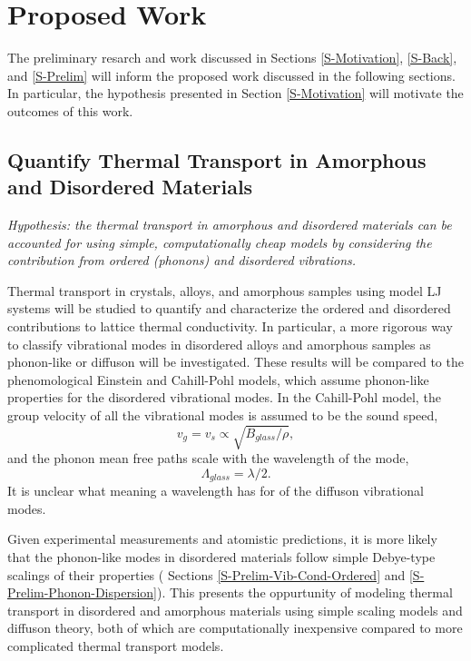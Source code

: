 \documentclass[letterpaper,12pt]{article}
\begin{document}
\section{\label{S-Propsed-Work}Proposed Work}

The preliminary resarch and work discussed in Sections \ref{S-Motivation}, \ref{S-Back}, and \ref{S-Prelim} will inform the proposed work discussed in the following sections. In particular, the hypothesis presented in Section \ref{S-Motivation} will motivate the outcomes of this work.

\subsection{\label{S-Research-Objectives-1}Quantify Thermal Transport in Amorphous and Disordered Materials}

\textit{Hypothesis: the thermal transport in amorphous and disordered materials can be accounted for using simple, computationally cheap models by considering the contribution from ordered (phonons) and disordered vibrations.}

Thermal transport in crystals, alloys, and amorphous samples using model LJ systems will be studied to quantify and characterize the ordered and disordered contributions to lattice thermal conductivity. In particular, a more rigorous way to classify vibrational modes in disordered alloys and amorphous samples as phonon-like or diffuson will be investigated.  These results will be compared to the phenomological Einstein and Cahill-Pohl models,\cite{einstein1911,kittel1949,cahill1992} which assume phonon-like properties for the disordered vibrational modes. In the Cahill-Pohl model,\cite{PhysRevB.46.6131} the group velocity of all the vibrational modes is assumed to be the sound speed,
\begin{equation}\label{E-Seq}
v_g = v_s \propto \sqrt{B_{glass}/\rho},
\end{equation}
and the phonon mean free paths scale with the wavelength of the mode,
\begin{equation}\label{EQ:M:l_glass}
\Lambda_{glass} =  \lambda /2.
\end{equation}
It is unclear what meaning a wavelength has for of the diffuson vibrational modes. 

Given experimental measurements\cite{Moon_2002,PhysRevLett.102.035901,PhysRevB.81.104203,Zink_Pietri_Hellman_2006} and atomistic predictions,\cite{shenogin2009,He2011a} it is more likely that the phonon-like modes in disordered materials follow simple Debye-type scalings of their properties ( Sections \ref{S-Prelim-Vib-Cond-Ordered} and \ref{S-Prelim-Phonon-Dispersion}). This presents the oppurtunity of modeling thermal transport in disordered and amorphous materials using simple scaling models and diffuson theory, both of which are computationally inexpensive compared to more complicated thermal transport models.\cite{turney2008b}
\end{document}
